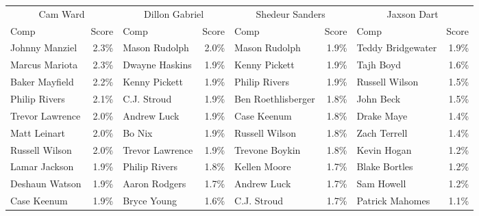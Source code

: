\begin{tabular}{lr|lr|lr|lr}

      \multicolumn{2}{c|}{Cam Ward} &
      \multicolumn{2}{c|}{Dillon Gabriel} &
      \multicolumn{2}{c|}{Shedeur Sanders} &
      \multicolumn{2}{c}{Jaxson Dart}
    \\
Comp & Score & Comp & Score & Comp & Score & Comp & Score \\
  \hline
Johnny Manziel & 2.3\% & Mason Rudolph & 2.0\% & Mason Rudolph & 1.9\% & Teddy Bridgewater & 1.9\% \\ 
  Marcus Mariota & 2.3\% & Dwayne Haskins & 1.9\% & Kenny Pickett & 1.9\% & Tajh Boyd & 1.6\% \\ 
  Baker Mayfield & 2.2\% & Kenny Pickett & 1.9\% & Philip Rivers & 1.9\% & Russell Wilson & 1.5\% \\ 
  Philip Rivers & 2.1\% & C.J. Stroud & 1.9\% & Ben Roethlisberger & 1.8\% & John Beck & 1.5\% \\ 
  Trevor Lawrence & 2.0\% & Andrew Luck & 1.9\% & Case Keenum & 1.8\% & Drake Maye & 1.4\% \\ 
  Matt Leinart & 2.0\% & Bo Nix & 1.9\% & Russell Wilson & 1.8\% & Zach Terrell & 1.4\% \\ 
  Russell Wilson & 2.0\% & Trevor Lawrence & 1.9\% & Trevone Boykin & 1.8\% & Kevin Hogan & 1.2\% \\ 
  Lamar Jackson & 1.9\% & Philip Rivers & 1.8\% & Kellen Moore & 1.7\% & Blake Bortles & 1.2\% \\ 
  Deshaun Watson & 1.9\% & Aaron Rodgers & 1.7\% & Andrew Luck & 1.7\% & Sam Howell & 1.2\% \\ 
  Case Keenum & 1.9\% & Bryce Young & 1.6\% & C.J. Stroud & 1.7\% & Patrick Mahomes & 1.1\% \\ 
\end{tabular}
